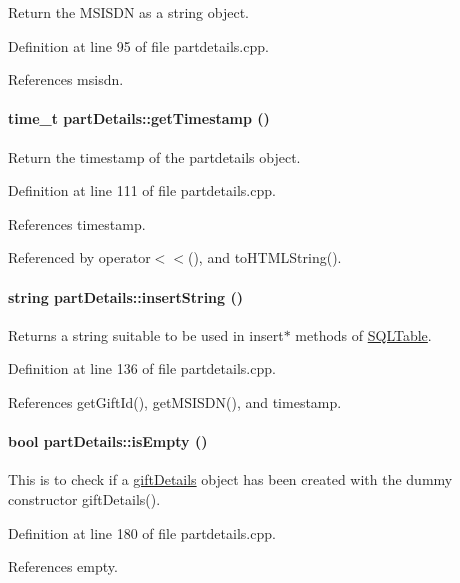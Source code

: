 Return the MSISDN as a string object. 

Definition at line 95 of file partdetails.cpp.

References msisdn.\hypertarget{classpartDetails_partDetailsa8}{
\paragraph[getTimestamp]{\setlength{\rightskip}{0pt plus 5cm}time\_\-t part\-Details::get\-Timestamp ()}\hfill}
\label{classpartDetails_partDetailsa8}


Return the timestamp of the partdetails object. 

Definition at line 111 of file partdetails.cpp.

References timestamp.

Referenced by operator$<$$<$(), and to\-HTMLString().\hypertarget{classpartDetails_partDetailsa11}{
\paragraph[insertString]{\setlength{\rightskip}{0pt plus 5cm}string part\-Details::insert\-String ()}\hfill}
\label{classpartDetails_partDetailsa11}


Returns a string suitable to be used in insert$\ast$ methods of \hyperlink{classSQLTable}{SQLTable}. 

Definition at line 136 of file partdetails.cpp.

References get\-Gift\-Id(), get\-MSISDN(), and timestamp.\hypertarget{classpartDetails_partDetailsa14}{
\paragraph[isEmpty]{\setlength{\rightskip}{0pt plus 5cm}bool part\-Details::is\-Empty ()}\hfill}
\label{classpartDetails_partDetailsa14}


This is to check if a \hyperlink{classgiftDetails}{gift\-Details} object has been created with the dummy constructor gift\-Details(). 

Definition at line 180 of file partdetails.cpp.

References empty.

